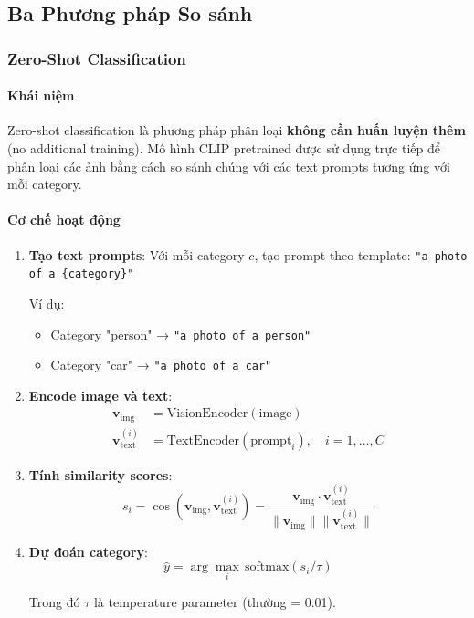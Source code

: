 \subsection{Ba Phương pháp So sánh}\label{subsec:three-methods}

\subsubsection{Zero-Shot Classification}\label{subsubsec:zero-shot}

\paragraph{Khái niệm}
Zero-shot classification là phương pháp phân loại \textbf{không cần huấn luyện thêm} (no additional training). Mô hình CLIP pretrained được sử dụng trực tiếp để phân loại các ảnh bằng cách so sánh chúng với các text prompts tương ứng với mỗi category.

\paragraph{Cơ chế hoạt động}
\begin{enumerate}
    \item \textbf{Tạo text prompts}: Với mỗi category $c$, tạo prompt theo template: \texttt{"a photo of a \{category\}"}

    Ví dụ:
    \begin{itemize}
        \item Category "person" → \texttt{"a photo of a person"}
        \item Category "car" → \texttt{"a photo of a car"}
    \end{itemize}

    \item \textbf{Encode image và text}:
    \begin{align}
        \mathbf{v}_{\text{img}} &= \text{VisionEncoder}(\text{image}) \\
        \mathbf{v}_{\text{text}}^{(i)} &= \text{TextEncoder}(\text{prompt}_i), \quad i=1,\ldots,C
    \end{align}

    \item \textbf{Tính similarity scores}:
    \begin{equation}
        s_i = \cos(\mathbf{v}_{\text{img}}, \mathbf{v}_{\text{text}}^{(i)}) = \frac{\mathbf{v}_{\text{img}} \cdot \mathbf{v}_{\text{text}}^{(i)}}{\|\mathbf{v}_{\text{img}}\| \|\mathbf{v}_{\text{text}}^{(i)}\|}
    \end{equation}

    \item \textbf{Dự đoán category}:
    \begin{equation}
        \hat{y} = \arg\max_{i} \, \text{softmax}(s_i / \tau)
    \end{equation}

    Trong đó $\tau$ là temperature parameter (thường = 0.01).
\end{enumerate}

